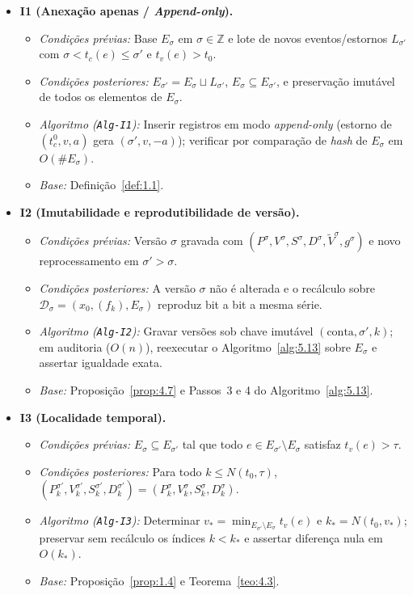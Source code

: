 \documentclass[11pt, a4paper]{article}
\theoremstyle{definition}
\theoremstyle{plain}
\theoremstyle{remark}
\begin{document}
\begin{itemize}
    \item \textbf{I1 (Anexação apenas / \emph{Append-only}).}
    \begin{itemize}
        \item \emph{Condições prévias:} Base $E_\sigma$ em $\sigma \in \mathbb{Z}$ e lote de novos eventos/estornos $L_{\sigma'}$ com $\sigma < t_c(e) \le \sigma'$ e $t_v(e) > t_0$.
        \item \emph{Condições posteriores:} $E_{\sigma'} = E_\sigma \sqcup L_{\sigma'}$, $E_\sigma \subseteq E_{\sigma'}$, e preservação imutável de todos os elementos de $E_\sigma$.
        \item \emph{Algoritmo (\texttt{Alg-I1}):} Inserir registros em modo \emph{append-only} (estorno de $(t_c^0, v, a)$ gera $(\sigma', v, -a)$); verificar por comparação de \emph{hash} de $E_\sigma$ em $O(\#E_\sigma)$.
        \item \emph{Base:} Definição~\ref{def:1.1}.
    \end{itemize}

    \item \textbf{I2 (Imutabilidade e reprodutibilidade de versão).}
    \begin{itemize}
        \item \emph{Condições prévias:} Versão $\sigma$ gravada com $(P^\sigma, V^\sigma, S^\sigma, D^\sigma, \tilde{V}^\sigma, g^\sigma)$ e novo reprocessamento em $\sigma' > \sigma$.
        \item \emph{Condições posteriores:} A versão $\sigma$ não é alterada e o recálculo sobre $\mathcal{D}_\sigma = (x_0, (f_k), E_\sigma)$ reproduz bit a bit a mesma série.
        \item \emph{Algoritmo (\texttt{Alg-I2}):} Gravar versões sob chave imutável $(\text{conta}, \sigma', k)$; em auditoria ($O(n)$), reexecutar o Algoritmo~\ref{alg:5.13} sobre $E_\sigma$ e assertar igualdade exata.
        \item \emph{Base:} Proposição~\ref{prop:4.7} e Passos~3 e 4 do Algoritmo~\ref{alg:5.13}.
    \end{itemize}

    \item \textbf{I3 (Localidade temporal).}
    \begin{itemize}
        \item \emph{Condições prévias:} $E_\sigma \subseteq E_{\sigma'}$ tal que todo $e \in E_{\sigma'} \setminus E_\sigma$ satisfaz $t_v(e) > \tau$.
        \item \emph{Condições posteriores:} Para todo $k \le N(t_0, \tau)$, $(P_k^{\sigma'}, V_k^{\sigma'}, S_k^{\sigma'}, D_k^{\sigma'}) = (P_k^\sigma, V_k^\sigma, S_k^\sigma, D_k^\sigma)$.
        \item \emph{Algoritmo (\texttt{Alg-I3}):} Determinar $v_* = \min_{E_{\sigma'}\setminus E_\sigma} t_v(e)$ e $k_* = N(t_0, v_*)$; preservar sem recálculo os índices $k < k_*$ e assertar diferença nula em $O(k_*)$.
        \item \emph{Base:} Proposição~\ref{prop:1.4} e Teorema~\ref{teo:4.3}.
    \end{itemize}


\end{itemize}
\end{document}
